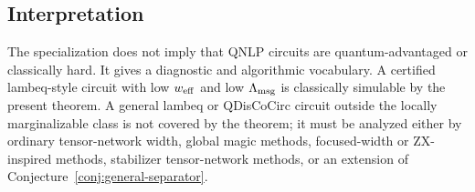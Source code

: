 \subsection{Interpretation}

The specialization does not imply that QNLP circuits are quantum-advantaged or classically hard. It gives a diagnostic and algorithmic vocabulary. A certified lambeq-style circuit with low \(w_{\mathrm{eff}}\) and low \(\Lambda_{\mathrm{msg}}\) is classically simulable by the present theorem. A general lambeq or QDisCoCirc circuit outside the locally marginalizable class is not covered by the theorem; it must be analyzed either by ordinary tensor-network width, global magic methods, focused-width or ZX-inspired methods, stabilizer tensor-network methods, or an extension of Conjecture~\ref{conj:general-separator}.
